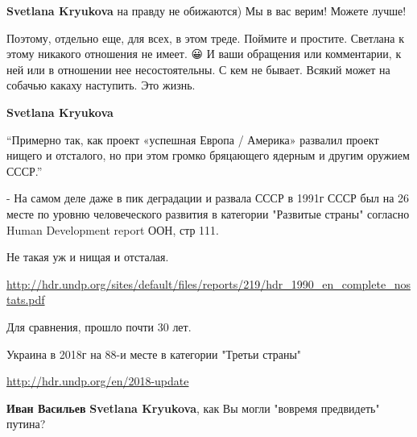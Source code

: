 \begin{itemize}
\begin{itemize}
\textbf{Svetlana Kryukova} на правду не обижаются) Мы в вас верим! Можете лучше!

 
Поэтому, отдельно еще, для всех, в этом треде. Поймите и простите. Светлана к этому никакого отношения не имеет. 😀 И ваши обращения или комментарии, к ней или в отношении нее несостоятельны. С кем не бывает. Всякий может на собачью какаху наступить. Это жизнь.

 
\textbf{Svetlana Kryukova} 

\enquote{Примерно так, как проект «успешная Европа / Америка» развалил проект нищего и
отсталого, но при этом громко бряцающего ядерным и другим оружием СССР.}

- На самом деле даже в пик деградации и развала СССР в 1991г СССР был на 26
месте по уровню человеческого развития в категории "Развитые страны" согласно
Human Development report ООН, стр 111.

Не такая уж и нищая и отсталая.\par
\url{http://hdr.undp.org/sites/default/files/reports/219/hdr_1990_en_complete_nostats.pdf}

Для сравнения, прошло почти 30 лет.

Украина в 2018г на 88-и месте в категории "Третьи страны"

\url{http://hdr.undp.org/en/2018-update}

 
\textbf{Иван Васильев} \textbf{Svetlana Kryukova}, как Вы могли "вовремя предвидеть" путина?

 

\end{itemize}
\end{itemize}
